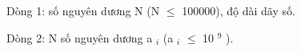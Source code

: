 Dòng 1: số nguyên dương N (N  $\le$  100000), độ dài dãy số.

Dòng 2: N số nguyên dương a $_ i $ (a $_ i $  $\le$  10 $^ 9 $ ).

\
